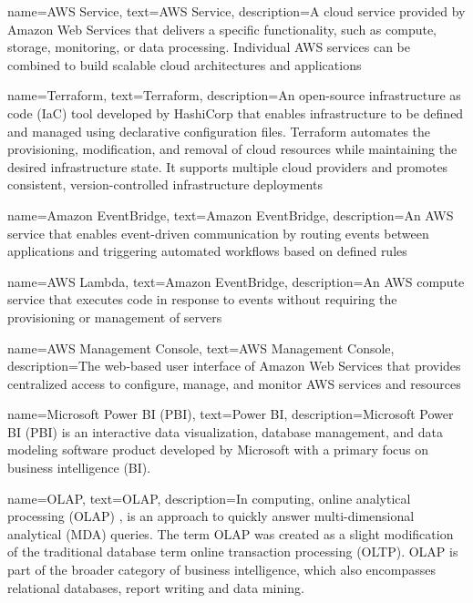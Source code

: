 {
    name={AWS Service},
    text={AWS Service},
    description={A cloud service provided by Amazon Web Services that delivers a specific functionality, such as compute, storage, monitoring, or data processing. Individual AWS services can be combined to build scalable cloud architectures and applications}
}


{
    name={Terraform},
        text={Terraform},
    description={An open-source infrastructure as code (IaC) tool developed by HashiCorp that enables infrastructure to be defined and managed using declarative configuration files. Terraform automates the provisioning, modification, and removal of cloud resources while maintaining the desired infrastructure state. It supports multiple cloud providers and promotes consistent, version-controlled infrastructure deployments}
}


{
    name={Amazon EventBridge},
     text={Amazon EventBridge},
    description={An AWS service that enables event-driven communication by routing events between applications and triggering automated workflows based on defined rules}
}

{
    name={AWS Lambda},
    text={Amazon EventBridge},
    description={An AWS compute service that executes code in response to events without requiring the provisioning or management of servers}
}

{
    name={AWS Management Console},
    text={AWS Management Console},
    description={The web-based user interface of Amazon Web Services that provides centralized access to configure, manage, and monitor AWS services and resources}
}

{
    name={Microsoft Power BI (PBI)},
    text={Power BI},
    description={Microsoft Power BI (PBI) is an interactive data visualization, database management, and data modeling software product developed by Microsoft with a primary focus on business intelligence (BI).}
}

{
    name={OLAP},
    text={OLAP},
    description={In computing, online analytical processing (OLAP) , is an approach to quickly answer multi-dimensional analytical (MDA) queries. The term OLAP was created as a slight modification of the traditional database term online transaction processing (OLTP). OLAP is part of the broader category of business intelligence, which also encompasses relational databases, report writing and data mining.}
}


